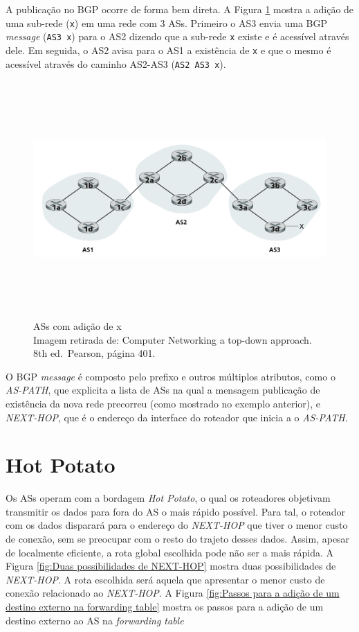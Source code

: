A publicação no BGP ocorre de forma bem direta. A Figura \ref{fig:ASs com adição de x} mostra a
adição de uma sub-rede (\texttt{x}) em uma rede com 3 ASs. Primeiro o AS3
envia uma BGP \emph{message} (\texttt{AS3\ x}) para o AS2 dizendo que a
sub-rede \texttt{x} existe e é acessível através dele. Em seguida, o AS2
avisa para o AS1 a existência de \texttt{x} e que o mesmo é acessível
através do caminho AS2-AS3 (\texttt{AS2\ AS3\ x}).


\begin{figure}[h!]
\centering
\includegraphics[keepaspectratio, width=12cm, height=9cm]{imagens/14/14 - SAs com a adicao de x.png}
\caption{ASs com adição de x \\
Imagem retirada de: Computer Networking a top-down approach. 8th
ed.~Pearson, página 401. \\}
\label{fig:ASs com adição de x}
\end{figure}



O BGP \emph{message} é composto pelo prefixo e outros múltiplos
atributos, como o \emph{AS-PATH}, que explicita a lista de ASs na qual a
mensagem publicação de existência da nova rede precorreu (como mostrado
no exemplo anterior), e \emph{NEXT-HOP}, que é o endereço da interface
do roteador que inicia a o \emph{AS-PATH}.

\hypertarget{hot-potato}{%
\section{Hot Potato}\label{hot-potato}}

Os ASs operam com a bordagem \emph{Hot Potato}, o qual os roteadores
objetivam transmitir os dados para fora do AS o mais rápido possível.
Para tal, o roteador com os dados disparará para o endereço do
\emph{NEXT-HOP} que tiver o menor custo de conexão, sem se preocupar com
o resto do trajeto desses dados. Assim, apesar de localmente eficiente,
a rota global escolhida pode não ser a mais rápida. A Figura \ref{fig:Duas possibilidades de NEXT-HOP} mostra
duas possibilidades de \emph{NEXT-HOP}. A rota escolhida será aquela que
apresentar o menor custo de conexão relacionado ao \emph{NEXT-HOP}. A
Figura \ref{fig:Passos para a adição de um destino externo na forwarding
table} mostra os passos para a adição de um destino externo ao AS na
\emph{forwarding table}


